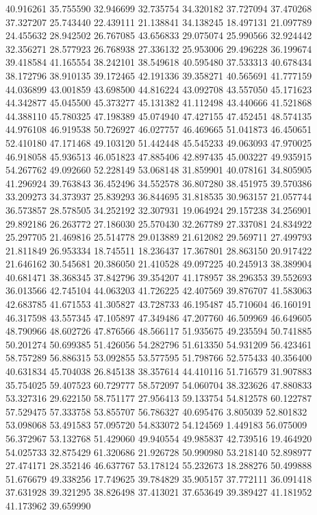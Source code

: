 40.916261
35.755590
32.946699
32.735754
34.320182
37.727094
37.470268
37.327207
25.743440
22.439111
21.138841
34.138245
18.497131
21.097789
24.455632
28.942502
26.767085
43.656833
29.075074
25.990566
32.924442
32.356271
28.577923
26.768938
27.336132
25.953006
29.496228
36.199674
39.418584
41.165554
38.242101
38.549618
40.595480
37.533313
40.678434
38.172796
38.910135
39.172465
42.191336
39.358271
40.565691
41.777159
44.036899
43.001859
43.698500
44.816224
43.092708
43.557050
45.171623
44.342877
45.045500
45.373277
45.131382
41.112498
43.440666
41.521868
44.388110
45.780325
47.198389
45.074940
47.427155
47.452451
48.574135
44.976108
46.919538
50.726927
46.027757
46.469665
51.041873
46.450651
52.410180
47.171468
49.103120
51.442448
45.545233
49.063093
47.970025
46.918058
45.936513
46.051823
47.885406
42.897435
45.003227
49.935915
54.267762
49.092660
52.228149
53.068148
31.859901
40.078161
34.805905
41.296924
39.763843
36.452496
34.552578
36.807280
38.451975
39.570386
33.209273
34.373937
25.839293
36.844695
31.818535
30.963157
21.057744
36.573857
28.578505
34.252192
32.307931
19.064924
29.157238
34.256901
29.892186
26.263772
27.186030
25.570430
32.267789
27.337081
24.834922
25.297705
21.469816
25.514778
29.013889
21.612082
29.569711
27.499793
21.811849
26.953334
18.745511
18.236437
17.367801
28.863150
20.917422
21.646162
30.545681
20.386050
21.410528
49.097225
40.245913
38.389904
40.681471
38.368345
37.842796
39.354207
41.178957
38.296353
39.552693
36.013566
42.745104
44.063203
41.726225
42.407569
39.876707
41.583063
42.683785
41.671553
41.305827
43.728733
46.195487
45.710604
46.160191
46.317598
43.557345
47.105897
47.349486
47.207760
46.509969
46.649605
48.790966
48.602726
47.876566
48.566117
51.935675
49.235594
50.741885
50.201274
50.699385
51.426056
54.282796
51.613350
54.931209
56.423461
58.757289
56.886315
53.092855
53.577595
51.798766
52.575433
40.356400
40.631834
45.704038
26.845138
38.357614
44.410116
51.716579
31.907883
35.754025
59.407523
60.729777
58.572097
54.060704
38.323626
47.880833
53.327316
29.622150
58.751177
27.956413
59.133754
54.812578
60.122787
57.529475
57.333758
53.855707
56.786327
40.695476
3.805039
52.801832
53.098068
53.491583
57.095720
54.833072
54.124569
1.449183
56.075009
56.372967
53.132768
51.429060
49.940554
49.985837
42.739516
19.464920
54.025733
32.875429
61.320686
21.926728
50.990980
53.218140
52.898977
27.474171
28.352146
46.637767
53.178124
55.232673
18.288276
50.499888
51.676679
49.338256
17.749625
39.784829
35.905157
37.772111
36.091418
37.631928
39.321295
38.826498
37.413021
37.653649
39.389427
41.181952
41.173962
39.659990
